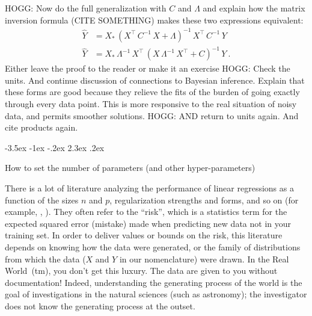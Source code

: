 \documentclass[12pt,letterpaper]{article}
\makeatletter
\renewcommand\section{\@startsection {section}{1}{\z@}%
  {-3.5ex \@plus -1ex \@minus -.2ex}%
  {2.3ex \@plus.2ex}%
  {\raggedright\normalfont\Large\bfseries}}
\makeatother
\begin{document}
HOGG: Now do the full generalization with $C$ and $\Lambda$ and explain how the matrix inversion formula (CITE SOMETHING) makes these two expressions equivalent:
\begin{align}\label{eq:LambdaC1}
    \hat{Y} &= X_\ast\,(X^\top\,C^{-1}\,X + \Lambda)^{-1}\,X^\top\,C^{-1}\,Y
    \\ \label{eq:LambdaC2}
    \hat{Y} &= X_\ast\,\Lambda^{-1}\,X^\top\,(X\,\Lambda^{-1}\,X^\top + C)^{-1}\,Y
    ~.
\end{align}
Either leave the proof to the reader or make it an exercise HOGG: Check the units. And continue discussion of connections to Bayesian inference. Explain that these forms are good because they relieve the fits of the burden of going exactly through every data point. This is more responsive to the real situation of noisy data, and permits smoother solutions.
HOGG: AND return to units again. And cite products again.

\section{How to set the number of parameters (and other hyper-parameters)}\label{sec:dd}

There is a lot of literature analyzing the performance of linear regressions as a function of the sizes $n$ and $p$, regularization strengths and forms, and so on (for example, \citealt{bartlett2020benign}, \citealt{hastie2019surprises} ).
They often refer to the ``risk'', which is a statistics term for the expected squared error (mistake) made when predicting new data not in your training set.
In order to deliver values or bounds on the risk, this literature depends on knowing how the data were generated, or the family of distributions from which the data ($X$ and $Y$ in our nomenclature) were drawn.
In the Real World~(tm), you don't get this luxury.
The data are given to you without documentation!
Indeed, understanding the generating process of the world is the goal of investigations in the natural sciences (such as astronomy); the investigator does not know the generating process at the outset.
\end{document}
